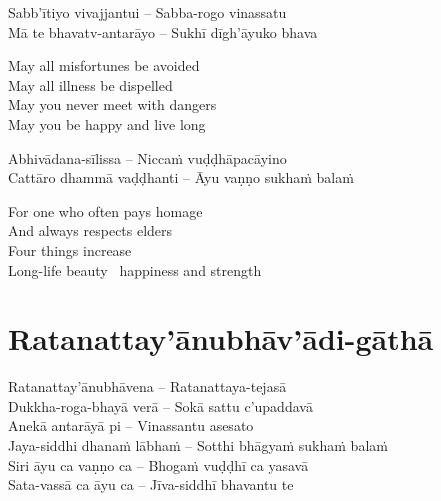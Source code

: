 \begin{twochants}
  Sabb'ītiyo vivajjantui – Sabba-rogo vinassatu\\
  Mā te bhavatv-antarāyo – Sukhī dīgh'āyuko bhava
\end{twochants}

\begin{english-verses}
  May all misfortunes be avoided\\
  May all illness be dispelled\\
  May you never meet with dangers\\
  May you be happy and live long
\end{english-verses}

\suttaRef{[Khp A]}

\begin{twochants}
  Abhivādana-sīlissa – Niccaṁ vuḍḍhāpacāyino\\
  Cattāro dhammā vaḍḍhanti – Āyu vaṇṇo sukhaṁ balaṁ\hyperlink{endnote118-appendix}{\hypertarget{endnote118-body}{}}
\end{twochants}

\begin{english-verses}
  For one who often pays homage\\
  And always respects elders\\
  Four things increase\\
  Long-life beauty \breathmark\ happiness and strength
\end{english-verses}

\suttaRef{[Dhp 109]}

\setsecheadstyle{\subsectionFmt}
\section{Ratanattay'ānubhāv'ādi-gāthā}
\label{ratanattayanubhavadi-gatha}

\vspace{-0.6em}

\begin{pali-hang}
Ratanattay'ānubhāvena – Ratanattaya-tejasā\\
Dukkha-roga-bhayā verā – Sokā sattu c'upaddavā\\
Anekā antarāyā pi – Vinassantu asesato\\
Jaya-siddhi dhanaṁ lābhaṁ – Sotthi bhāgyaṁ sukhaṁ balaṁ\\
Siri āyu ca vaṇṇo ca – Bhogaṁ vuḍḍhī ca yasavā\\
Sata-vassā ca āyu ca – Jīva-siddhī bhavantu te
\end{pali-hang}

